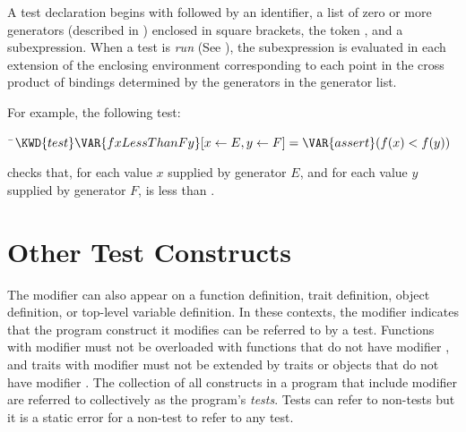 A test declaration begins with
 followed by an identifier, a list of zero or more generators
(described in ) enclosed in square brackets, the
token \EXP{=}, and a subexpression.
When a test is \emph{run} (See ), the
subexpression is evaluated in each extension of the enclosing environment
corresponding to each point in the cross product
of bindings determined by the generators in the generator list.

For example, the following test:
\begin{Fortress}
{\tt~}\pushtabs\=\+\( \KWD{test} \VAR{fxLessThanFy}[{x \leftarrow E}, {y \leftarrow F}] = \VAR{assert} (f(x) < f(y))\)\-\\\poptabs
\end{Fortress}
checks that, for each value $x$ supplied by generator $E$,
and for each value $y$ supplied by generator $F$,
 is less than .


\section{Other Test Constructs}
The  modifier can also appear
on a function definition, trait definition, object definition,
or top-level variable definition. In these contexts, the modifier indicates
that the program construct it modifies can be referred to by a test.
Functions with modifier  must not be overloaded with
functions that do not have modifier , and
traits with modifier  must not be extended
by traits or objects that do not have modifier .
The collection of all constructs in a program that include modifier 
are referred to collectively as the program's \emph{tests}.
Tests can refer to non-tests but
it is a static error for a non-test to refer to any test.

